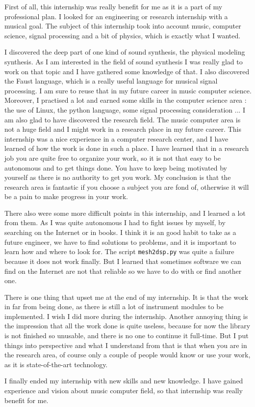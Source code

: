 First of all, this internship was really benefit for me as it is a part of my professional plan. I looked for an engineering or research internship with a musical goal. The subject of this internship took into account music, computer science, signal processing and a bit of physics, which is exactly what I wanted.

I discovered the deep part of one kind of sound synthesis, the physical modeling synthesis. As I am interested in the field of sound synthesis I was really glad to work on that topic and I have gathered some knowledge of that. I also discovered the Faust language, which is a really useful language for musical signal processing. I am sure to reuse that in my future career in music computer science. Moreover, I practised a lot and earned some skills in the computer science area : the use of Linux, the python language, some signal processing consideration ...
I am also glad to have discovered the research field. The music computer area is not a huge field and I might work in a research place in my future career. This internship was a nice experience in a computer research center, and I have learned of how the work is done in such a place. I have learned that in a research job you are quite free to organize your work, so it is not that easy to be autonomous and to get things done. You have to keep being motivated by yourself as there is no authority to get you work. My conclusion is that the research area is fantastic if you choose a subject you are fond of, otherwise it will be a pain to make progress in your work.

There also were some more difficult points in this internship, and I learned a lot from them. As I was quite autonomous I had to fight issues by myself, by searching on the Internet or in books. I think it is an good habit to take as a future engineer, we have to find solutions to problems, and it is important to learn how and where to look for. The script \texttt{mesh2dsp.py} was quite a failure because it does not work finally. But I learned that sometimes software we can find on the Internet are not that reliable so we have to do with or find another one.

There is one thing that upset me at the end of my internship. It is that the work in far from being done, as there is still a lot of instrument modules to be implemented. I wish I did more during the internship. Another annoying thing is the impression that all the work done is quite useless, because for now the library is not finished so unusable, and there is no one to continue it full-time. But I put things into perspective and what I understand from that is that when you are in the research area, of course only a couple of people would know or use your work, as it is state-of-the-art technology.

I finally ended my internship with new skills and new knowledge. I have gained experience and vision about music computer field, so that internship was really benefit for me.
